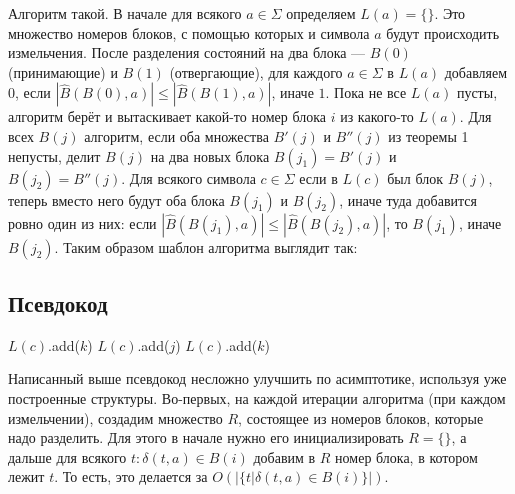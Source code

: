 \documentclass{article}
\begin{document}
Алгоритм такой. В начале для всякого $a \in \Sigma$ определяем $L(a) = \{\}$. Это множество номеров блоков, с помощью которых и символа $a$ будут происходить измельчения. После разделения состояний на два блока --- $B(0)$ (принимающие) и $B(1)$ (отвергающие), для каждого $a \in \Sigma$ в $L(a)$ добавляем $0$, если $|\hat B(B(0), a)| \le |\hat B(B(1), a)|$, иначе $1$. Пока не все $L(a)$ пусты, алгоритм берёт и вытаскивает какой-то номер блока $i$ из какого-то $L(a)$. Для всех $B(j)$ алгоритм, если оба множества $B'(j)$ и $B''(j)$ из теоремы 1 непусты, делит $B(j)$ на два новых блока $B(j_1) = B'(j)$ и $B(j_2) = B''(j)$. Для всякого символа $c \in \Sigma$ если в $L(c)$ был блок $B(j)$, теперь вместо него будут оба блока $B(j_1)$ и $B(j_2)$, иначе туда добавится ровно один из них: если $|\hat B(B(j_1), a)| \le |\hat B(B(j_2), a)|$, то $B(j_1)$, иначе $B(j_2)$. Таким образом шаблон алгоритма выглядит так:
\hypertarget{pseudocode}{\subsection{Псевдокод}}
\begin{algorithm}
  \begin{algorithmic}[1]
  \label{line1}
  \label{line2}
      \label{line5}
      \label{line6}
      \label{line8}

          \label{line10}
          \State $L(c)$.add($k$)
          \label{line11}
          \label{line12}
          \State $L(c)$.add($j$)
          \label{line13}
        \Else
          \State $L(c)$.add($k$)
          \label{line15}
        \EndIf
        \label{line16}
      \EndFor
    \EndIf
  \EndFor
  \EndWhile
  \end{algorithmic}
\end{algorithm}
Написанный выше псевдокод несложно улучшить по асимптотике, используя уже построенные структуры. Во-первых, на каждой итерации алгоритма (при каждом измельчении), создадим множество $R$, состоящее из номеров блоков, которые надо разделить. Для этого в начале нужно его инициализировать $R = \{\}$, а дальше для всякого $t: \delta(t, a) \in B(i)$ добавим в $R$ номер блока, в котором лежит $t$. То есть, это делается за $O(|\{t | \delta(t, a) \in B(i)\}|)$.
\end{document}
